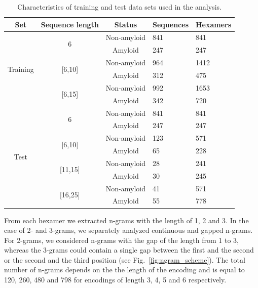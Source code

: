\documentclass[a4,center,fleqn]{NAR}
\begin{document}
\begin{table}
\centering
\small
\caption{Characteristics of training and test data sets used in the analysis.}
\label{tab:data_sets}
\begin{tabular}{cccll}
\toprule
Set & Sequence length & Status & Sequences & Hexamers \\ 
\midrule
\multirow{6}{*}{Training} & \multirow{2}{*}{6} & Non-amyloid & 841 & 841 
\\
 &  & \cellcolor[gray]{0.85}Amyloid & \cellcolor[gray]{0.85}247 & 
\cellcolor[gray]{0.85}247 \\
 \cline{2-5}
 & \multirow{2}{*}{{[}6,10{]}} & Non-amyloid & 964 & 1412 \\
 &  & \cellcolor[gray]{0.85}Amyloid & \cellcolor[gray]{0.85}312 & 
\cellcolor[gray]{0.85}475 \\
 \cline{2-5}
 & \multirow{2}{*}{{[}6,15{]}} & Non-amyloid & 992 & 1653 \\
 &  & \cellcolor[gray]{0.85}Amyloid & \cellcolor[gray]{0.85}342 & 
\cellcolor[gray]{0.85}720 \\
 \hline
 \hline
\multirow{8}{*}{Test} & \multirow{2}{*}{6} & Non-amyloid & 841 & 841 \\
 &  & \cellcolor[gray]{0.85}Amyloid & \cellcolor[gray]{0.85}247 & 
\cellcolor[gray]{0.85}247 \\
 \cline{2-5}
 & \multirow{2}{*}{{[}6,10{]}} & Non-amyloid & 123 & 571 \\
 &  & \cellcolor[gray]{0.85}Amyloid & \cellcolor[gray]{0.85}65 & 
\cellcolor[gray]{0.85}228 \\
 \cline{2-5}
 & \multirow{2}{*}{{[}11,15{]}} & Non-amyloid & 28 & 241 \\
 &  & \cellcolor[gray]{0.85}Amyloid & \cellcolor[gray]{0.85}30 & 
\cellcolor[gray]{0.85}245 \\
 \cline{2-5}
 & \multirow{2}{*}{{[}16,25{]}} & Non-amyloid & 41 & 571 \\
 &  & \cellcolor[gray]{0.85}Amyloid & \cellcolor[gray]{0.85}55 & 
\cellcolor[gray]{0.85}778 \\
 \bottomrule
\end{tabular}
\end{table}

  From each hexamer we extracted n-grams with the length of 1, 2 and 3. 
In the case of 2- and 3-grams, we separately analyzed continuous and gapped
n-grams. For 2-grams, we considered n-grams with the gap of the length from 1 to 3, 
whereas the 3-grams could contain a single gap between the first and the second or 
the second and the third position (see Fig.~\ref{fig:ngram_scheme}). The total number 
of n-grams depends on the the length of the encoding and is equal to 120, 260, 480 and 
798 for encodings of length 3, 4, 5 and 6 respectively.
\end{document}
